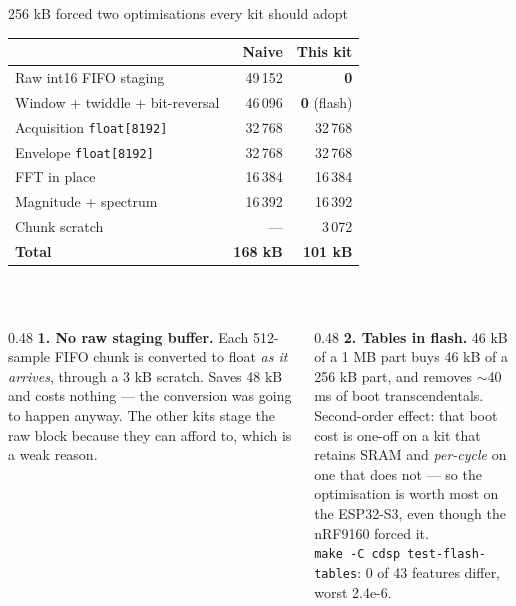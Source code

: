 \documentclass[aspectratio=169,10pt]{beamer}
\begin{document}
\begin{frame}{256 kB forced two optimisations every kit should adopt}
  \centering
  \scriptsize
  \begin{tabular}{@{}lrr@{}}
    \toprule
    & \textbf{Naive} & \textbf{This kit} \\
    \midrule
    Raw int16 FIFO staging          & 49\,152 & \textcolor{pdmgood}{\textbf{0}} \\
    Window + twiddle + bit-reversal & 46\,096 & \textcolor{pdmgood}{\textbf{0}} (flash) \\
    Acquisition \texttt{float[8192]}& 32\,768 & 32\,768 \\
    Envelope \texttt{float[8192]}   & 32\,768 & 32\,768 \\
    FFT in place                    & 16\,384 & 16\,384 \\
    Magnitude + spectrum            & 16\,392 & 16\,392 \\
    Chunk scratch                   & ---     & 3\,072 \\
    \midrule
    \textbf{Total}                  & \textbf{168 kB} & \textbf{101 kB} \\
    \bottomrule
  \end{tabular}
  \\[3mm]
  \begin{columns}[T]
    \begin{column}{0.48\textwidth}
      \scriptsize
      \textbf{1. No raw staging buffer.} Each 512-sample FIFO chunk is converted
      to float \emph{as it arrives}, through a 3 kB scratch. Saves 48 kB and
      costs nothing --- the conversion was going to happen anyway. The other
      kits stage the raw block because they can afford to, which is a weak
      reason.
    \end{column}
    \begin{column}{0.48\textwidth}
      \scriptsize
      \textbf{2. Tables in flash.} 46 kB of a 1 MB part buys 46 kB of a 256 kB
      part, and removes $\sim$40 ms of boot transcendentals.
      \\[1mm]
      Second-order effect: that boot cost is one-off on a kit that retains SRAM
      and \emph{per-cycle} on one that does not --- so the optimisation is worth
      most on the ESP32-S3, even though the nRF9160 forced it.
      \\[1mm]
      \texttt{make -C cdsp test-flash-tables}: 0 of 43 features differ, worst
      2.4e-6.
    \end{column}
  \end{columns}
\end{frame}
\end{document}
